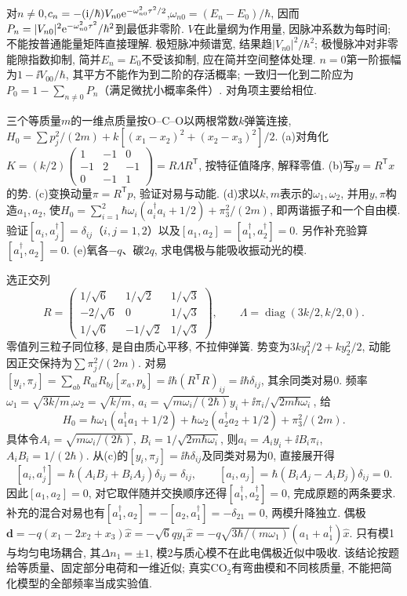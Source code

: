 \begin{solution}
对$n\neq0$,$c_n=-(\mathrm i/\hbar)V_{n0}\mathrm e^{-\omega_{n0}^2\tau^2/2}$,$\omega_{n0}=(E_n-E_0)/\hbar$, 因而$P_n=|V_{n0}|^2\mathrm e^{-\omega_{n0}^2\tau^2}/\hbar^2$到最低非零阶. $V$在此量纲为作用量, 因脉冲系数为每时间; 不能按普通能量矩阵直接理解. 极短脉冲频谱宽, 结果趋$|V_{n0}|^2/\hbar^2$; 极慢脉冲对非零能隙指数抑制, 简并$E_n=E_0$不受该抑制, 应在简并空间整体处理. $n=0$第一阶振幅为$1-\ii V_{00}/\hbar$, 其平方不能作为到二阶的存活概率; 一致归一化到二阶应为$P_0=1-\sum_{n\neq0}P_n$（满足微扰小概率条件）. 对角项主要给相位.
\end{solution}
\begin{exercise}
三个等质量$m$的一维点质量按O--C--O以两根常数$k$弹簧连接,$H_0=\sum p_j^2/(2m)+k[(x_1-x_2)^2+(x_2-x_3)^2]/2$. (a)对角化$K=(k/2)\left(\begin{smallmatrix}1&-1&0\\-1&2&-1\\0&-1&1\end{smallmatrix}\right)=R\Lambda R^{\mathsf T}$, 按特征值降序, 解释零值. (b)写$y=R^{\mathsf T}x$的势. (c)变换动量$\pi=R^{\mathsf T}p$, 验证对易与动能. (d)求以$k,m$表示的$\omega_1,\omega_2$, 并用$y,\pi$构造$a_1,a_2$, 使$H_0=\sum_{i=1}^2\hbar\omega_i(a_i^\dagger a_i+1/2)+\pi_3^2/(2m)$, 即两谐振子和一个自由模. 验证$[a_i,a_j^\dagger]=\delta_{ij}$（$i,j=1,2$）以及$[a_1,a_2]=[a_1^\dagger,a_2^\dagger]=0$. 另作补充验算$[a_1^\dagger,a_2]=0$. (e)氧各$-q$、碳$2q$, 求电偶极与能吸收振动光的模.
\end{exercise}
\begin{solution}
选正交列
\[
R=\begin{pmatrix}1/\sqrt6&1/\sqrt2&1/\sqrt3\\-2/\sqrt6&0&1/\sqrt3\\1/\sqrt6&-1/\sqrt2&1/\sqrt3\end{pmatrix},\qquad
\Lambda=\operatorname{diag}(3k/2,k/2,0).
\]
零值列三粒子同位移, 是自由质心平移, 不拉伸弹簧. 势变为$3ky_1^2/2+ky_2^2/2$, 动能因正交保持为$\sum\pi_j^2/(2m)$. 对易$[y_i,\pi_j]=\sum_{ab}R_{ai}R_{bj}[x_a,p_b]=\ii\hbar(R^{\mathsf T}R)_{ij}=\ii\hbar\delta_{ij}$, 其余同类对易0. 频率$\omega_1=\sqrt{3k/m}$,$\omega_2=\sqrt{k/m}$, $a_i=\sqrt{m\omega_i/(2\hbar)}y_i+\ii\pi_i/\sqrt{2m\hbar\omega_i}$, 给
\[
H_0=\hbar\omega_1(a_1^\dagger a_1+1/2)+\hbar\omega_2(a_2^\dagger a_2+1/2)+\pi_3^2/(2m).
\]
具体令$A_i=\sqrt{m\omega_i/(2\hbar)}$, $B_i=1/\sqrt{2m\hbar\omega_i}$, 则$a_i=A_iy_i+\ii B_i\pi_i$, $A_iB_i=1/(2\hbar)$. 从(c)的$[y_i,\pi_j]=\ii\hbar\delta_{ij}$及同类对易为0, 直接展开得
\[
[a_i,a_j^\dagger]=\hbar(A_iB_j+B_iA_j)\delta_{ij}=\delta_{ij},\qquad
[a_i,a_j]=\hbar(B_iA_j-A_iB_j)\delta_{ij}=0.
\]
因此$[a_1,a_2]=0$, 对它取伴随并交换顺序还得$[a_1^\dagger,a_2^\dagger]=0$, 完成原题的两条要求. 补充的混合对易也有$[a_1^\dagger,a_2]=-[a_2,a_1^\dagger]=-\delta_{21}=0$, 两模升降独立.  偶极$\boldsymbol d=-q(x_1-2x_2+x_3)\hat x=-\sqrt6qy_1\hat x=-q\sqrt{3\hbar/(m\omega_1)}(a_1+a_1^\dagger)\hat x$. 只有模1与均匀电场耦合, 其$\Delta n_1=\pm1$, 模2与质心模不在此电偶极近似中吸收. 该结论按题给等质量、固定部分电荷和一维近似; 真实CO$_2$有弯曲模和不同核质量, 不能把简化模型的全部频率当成实验值.
\end{solution}
